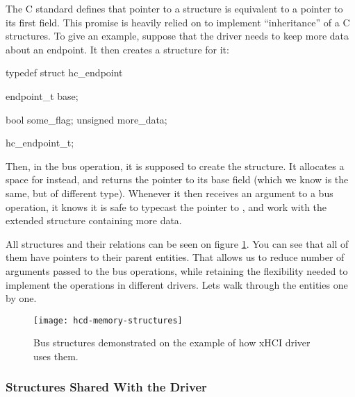 The C standard defines that pointer to a structure is equivalent to a pointer
to its first field. This promise is heavily relied on to implement
``inheritance'' of a C structures. To give an example, suppose that the driver
needs to keep more data about an endpoint. It then creates a structure for it:

\begin{code}
	typedef struct hc_endpoint {
		endpoint_t base;

		bool some_flag;
		unsigned more_data;
	} hc_endpoint_t;
\end{code}

Then, in the  bus operation, it is supposed to create the
 structure. It allocates a space for 
instead, and returns the pointer to its base field (which we know is the same,
but of different type). Whenever it then receives an 
argument to a bus operation, it knows it is safe to typecast the pointer to
, and work with the extended structure containing more
data.

All structures and their relations can be seen on figure
\ref{fig:hcd-memory-structures}. You can see that all of them have pointers to
their parent entities. That allows us to reduce number of arguments passed to
the bus operations, while retaining the flexibility needed to implement the
operations in different drivers. Lets walk through the entities one by one.

\begin{figure}
	\centering
	\label{fig:hcd-memory-structures}
	\texttt{[image: hcd-memory-structures]}
	\caption{Bus structures demonstrated on the example of how xHCI driver uses them.}
\end{figure}

\subsubsection{Structures Shared With the Driver}

